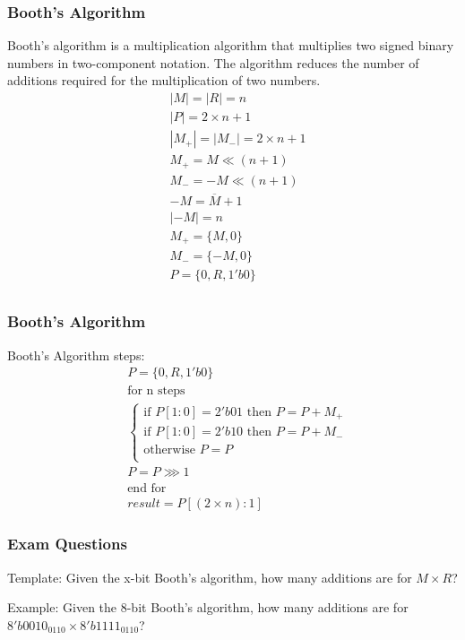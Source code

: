 \begin{frame}
    \frametitle{Booth's Algorithm}
 Booth's algorithm is a multiplication algorithm that multiplies two signed binary numbers in two-component notation. The algorithm reduces the number of additions required for the multiplication of two numbers.
    \begin{equation}
        \begin{aligned}
            &|M|=|R|=n\\
            &|P|=2 \times n + 1\\
            &|M_{+}|=|M_{-}|=2 \times n+1\\
            &M_{+}=M \ll (n + 1)\\
            &M_{-}=-M \ll (n + 1)\\
            &-M=\overline{M}+1\\
            &|-M|=n\\
            &M_{+}=\{M, 0\}\\
            &M_{-}=\{-M, 0\}\\
            &P=\{0,R,1'b0\}\\
        \end{aligned}
    \end{equation}
\end{frame}

\begin{frame}
    \frametitle{Booth's Algorithm}
 Booth's Algorithm steps:
    \begin{equation}
        \begin{aligned}
            &P=\{0,R,1'b0\}\\
            &\text{for n steps}\\
            &\begin{cases}
 \text{if } P[1:0]=2'b01 \text{ then } P=P+M_{+}\\
 \text{if } P[1:0]=2'b10 \text{ then } P=P+M_{-}\\
 \text{otherwise } P=P\\
            \end{cases}\\
            &P=P \ggg 1\\
            &\text{end for}\\
            &result=P[(2 \times n):1]
        \end{aligned}
    \end{equation}
\end{frame}

\begin{frame}
    \frametitle{Exam Questions}
 Template: Given the x-bit Booth's algorithm, how many additions are for $M \times R$?

 Example: Given the 8-bit Booth's algorithm, how many additions are for $8'b0010_0110 \times 8'b1111_0110$?
\end{frame}

